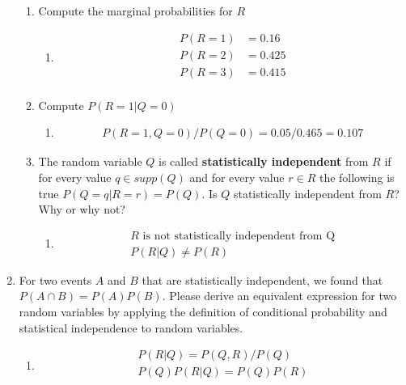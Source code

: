 \documentclass[krantz1,ChapterTOCs]{krantz}
\begin{document}
\begin{enumerate}
\begin{enumerate}
        \item Compute the marginal probabilities for $R$
        \begin{enumerate}
            \item {\color{red} 
            \begin{align*}
                P(R=1) &= 0.16\\
                P(R=2) &= 0.425\\
                P(R=3) &= 0.415\\
            \end{align*}
            }
        \end{enumerate}
        
        \item Compute $P(R=1 | Q=0)$
        \begin{enumerate}
            \item {\color{red} 
            \begin{align*}
                P(R=1,Q=0) / P(Q=0) = 0.05/0.465 = 0.107
            \end{align*}
            }
        \end{enumerate}

        \item The random variable $Q$ is called \textbf{statistically independent} from $R$ if for every value $q \in supp(Q)$ and for every value $r \in R$ the following is true $P(Q=q |R=r) = P(Q)$. Is $Q$ statistically independent from $R$? Why or why not?
        \begin{enumerate}
            \item { \color{red} 
            \begin{align*}
                R \text{ is not statistically independent from Q}\\       P(R|Q) \neq P(R)
            \end{align*}
            }
        \end{enumerate}
        
    \end{enumerate}
    \item For two events $A$ and $B$ that are statistically independent, we found that $P(A \cap B) = P(A)P(B)$. Please derive an equivalent expression for two random variables by applying the definition of conditional probability and statistical independence to random variables.

    \begin{enumerate}
            \item {\color{red} 
            \begin{align*}
                P(R|Q) = P(Q,R)/P(Q)\\
                P(Q)P(R|Q) = P(Q)P(R)\\
            \end{align*}
            }
    \end{enumerate}



\end{enumerate}
\end{document}
